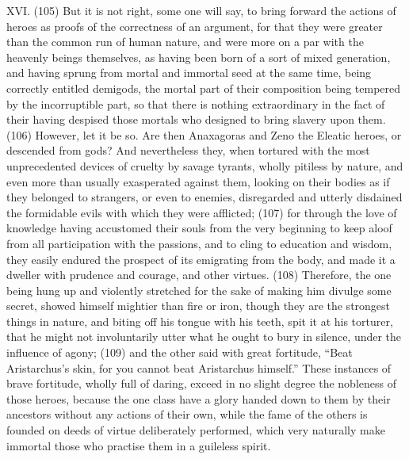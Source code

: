 XVI. (105) But it is not right, some one will say, to bring forward the actions of heroes as proofs of
the correctness of an argument, for that they were greater than the common run of human nature,
and were more on a par with the heavenly beings themselves, as having been born of a sort of
mixed generation, and having sprung from mortal and immortal seed at the same time, being
correctly entitled demigods, the mortal part of their composition being tempered by the incorruptible
part, so that there is nothing extraordinary in the fact of their having despised those mortals who
designed to bring slavery upon them. (106) However, let it be so. Are then Anaxagoras and Zeno
the Eleatic heroes, or descended from gods? And nevertheless they, when tortured with the most
unprecedented devices of cruelty by savage tyrants, wholly pitiless by nature, and even more than
usually exasperated against them, looking on their bodies as if they belonged to strangers, or even
to enemies, disregarded and utterly disdained the formidable evils with which they were afflicted;
(107) for through the love of knowledge having accustomed their souls from the very beginning to
keep aloof from all participation with the passions, and to cling to education and wisdom, they
easily endured the prospect of its emigrating from the body, and made it a dweller with prudence
and courage, and other virtues. (108) Therefore, the one being hung up and violently stretched for
the sake of making him divulge some secret, showed himself mightier than fire or iron, though they
are the strongest things in nature, and biting off his tongue with his teeth, spit it at his torturer, that
he might not involuntarily utter what he ought to bury in silence, under the influence of agony; (109)
and the other said with great fortitude, ``Beat Aristarchus's skin, for you cannot beat Aristarchus
himself.'' These instances of brave fortitude, wholly full of daring, exceed in no slight degree the
nobleness of those heroes, because the one class have a glory handed down to them by their
ancestors without any actions of their own, while the fame of the others is founded on deeds of
virtue deliberately performed, which very naturally make immortal those who practise them in a
guileless spirit.

